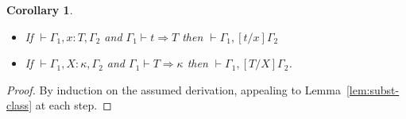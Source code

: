 \documentclass{article}
\newcommand{\tpsynth}[0]{\Rightarrow}
\newtheorem{corollary}[theorem]{Corollary}
\begin{document}
\begin{corollary}
  \ \\
  \begin{itemize}
  \item If \(\vdash \Gamma_1,x:T,\Gamma_2\) and \(\Gamma_1 \vdash t \tpsynth T\)
    then \(\vdash \Gamma_1,[t/x]\Gamma_2\)
    
  \item If \(\vdash \Gamma_1,X:\kappa,\Gamma_2\) and \(\Gamma_1 \vdash T
    \tpsynth \kappa\) then \(\vdash \Gamma_1,[T/X]\Gamma_2\).
  \end{itemize}
\end{corollary}
\begin{proof}
  By induction on the assumed derivation, appealing to
  Lemma~\ref{lem:subst-class} at each step.
\end{proof}
\end{document}

